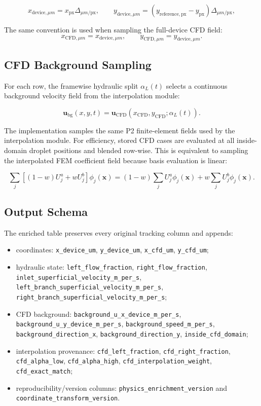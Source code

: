 \[
  x_{\mathrm{device},\mu m} = x_{\mathrm{px}}\Delta_{\mu m/\mathrm{px}},
  \qquad
  y_{\mathrm{device},\mu m} =
  (y_{\mathrm{reference,px}} - y_{\mathrm{px}})\Delta_{\mu m/\mathrm{px}},
\]

The same convention is used when sampling the full-device CFD field:
\[
  x_{\mathrm{CFD},\mu m} = x_{\mathrm{device},\mu m},
  \qquad
  y_{\mathrm{CFD},\mu m} = y_{\mathrm{device},\mu m}.
\]

\subsection{CFD Background Sampling}

For each row, the framewise hydraulic split \(\alpha_L(t)\) selects a continuous
background velocity field from the interpolation module:

\[
  \mathbf{u}_{\mathrm{bg}}(x,y,t)
  =
  \mathbf{u}_{\mathrm{CFD}}(x_{\mathrm{CFD}},y_{\mathrm{CFD}};\alpha_L(t)).
\]

The implementation samples the same P2 finite-element fields used by the
interpolation module. For efficiency, stored CFD cases are evaluated at all
inside-domain droplet positions and blended row-wise. This is equivalent to
sampling the interpolated FEM coefficient field because basis evaluation is
linear:

\[
  \sum_j\left[(1-w)U_j^a+wU_j^b\right]\phi_j(\mathbf{x})
  =
  (1-w)\sum_jU_j^a\phi_j(\mathbf{x})
  +
  w\sum_jU_j^b\phi_j(\mathbf{x}).
\]

\subsection{Output Schema}

The enriched table preserves every original tracking column and appends:

\begin{itemize}
  \item coordinates:
        \texttt{x\_device\_um}, \texttt{y\_device\_um},
        \texttt{x\_cfd\_um}, \texttt{y\_cfd\_um};
  \item hydraulic state:
        \texttt{left\_flow\_fraction}, \texttt{right\_flow\_fraction},
        \texttt{inlet\_superficial\_velocity\_m\_per\_s},
        \texttt{left\_branch\_superficial\_velocity\_m\_per\_s},
        \texttt{right\_branch\_superficial\_velocity\_m\_per\_s};
  \item CFD background:
        \texttt{background\_u\_x\_device\_m\_per\_s},
        \texttt{background\_u\_y\_device\_m\_per\_s},
        \texttt{background\_speed\_m\_per\_s},
        \texttt{background\_direction\_x},
        \texttt{background\_direction\_y},
        \texttt{inside\_cfd\_domain};
  \item interpolation provenance:
        \texttt{cfd\_left\_fraction}, \texttt{cfd\_right\_fraction},
        \texttt{cfd\_alpha\_low}, \texttt{cfd\_alpha\_high},
        \texttt{cfd\_interpolation\_weight}, \texttt{cfd\_exact\_match};
  \item reproducibility/version columns:
        \texttt{physics\_enrichment\_version} and
        \texttt{coordinate\_transform\_version}.
\end{itemize}

